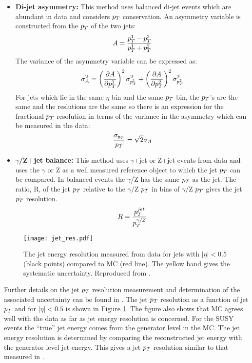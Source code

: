 \begin{itemize}
\item {\bf Di-jet asymmetry:} This method uses balanced di-jet events which are 
abundant in data and considers $p_{T}$ conservation. An asymmetry variable is 
constructed from the $p_{T}$ of the two jets:
\begin{equation}
A = \frac{p_{T}^{1} - p_{T}^{2}}{p_{T}^{1} + p_{T}^{2}}
\end{equation}
The variance of the asymmetry variable can be expressed as:
\begin{equation}
\sigma_{A}^{2} = \left(\frac{\partial A}{\partial
p_{T}^{1}}\right)^{2}\sigma_{p_{T}^{1}}^{2} + \left(\frac{\partial A}{\partial
p_{T}^{2}}\right)^{2}\sigma_{p_{T}^{2}}^{2}
\end{equation}
For jets which lie in the same $\eta$ bin and the same $p_{T}$ bin, the $p_{T}$'s
are the same and the reslutions are the same so there is an expression for the
fractional $p_{T}$ resolution in terms of the variance in the asymmetry which can
be measured in the data:
\begin{equation}
\frac{\sigma_{p_{T}}}{p_{T}} = \sqrt{2}\sigma_{A}
\end{equation}  
\item {\bf $\gamma$/Z+jet balance:} This method uses $\gamma$+jet or Z+jet
events from data and uses the $\gamma$ or Z as a well measured reference object
to which the jet $p_{T}$ can be compared. In balanced events the $\gamma$/Z has 
the same $p_{T}$ as the jet. The ratio, R, of the jet $p_{T}$ relative to the 
$\gamma$/Z $p_{T}$ in bins of $\gamma$/Z $p_{T}$ gives the jet $p_{T}$ resolution. 
\begin{equation}
R = \frac{p_{T}^{jet}}{p_{T}^{\gamma/Z}}
\end{equation}
\end{itemize}

\begin{figure}
\begin{center}
\texttt{[image: jet\_res.pdf]}
\end{center}
\caption{The jet energy resolution measured from data for jets with $|\eta| <
0.5$ (black points) compared to MC (red line). The yellow band gives the
systematic uncertainty. Reproduced from \cite{jec}.}
\label{fig:jet_res}
\end{figure}

Further details on the jet $p_{T}$ resolution measurement and determination of the
associated uncertainty can be found in \cite{jec}. The jet $p_{T}$ resolution as a
function of jet $p_{T}$ and for $|\eta| < 0.5$ is shown in Figure
\ref{fig:jet_res}. The figure also shows that MC agrees well with the
data as far as jet energy resolution is concerned. For the SUSY events the 
``true'' jet energy comes from the generator level in the MC. The jet energy 
resolution is determined by comparing the reconstructed jet energy with the 
generator level jet energy. This gives a jet $p_{T}$ resolution similar to that 
measured in \cite{jec}. \\


